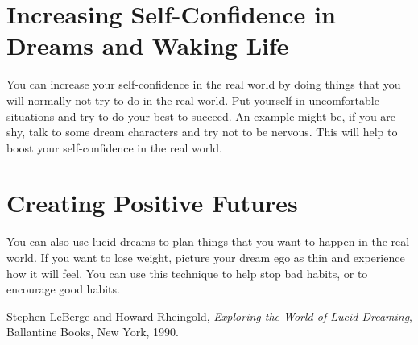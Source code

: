 \documentclass{book}
\begin{document}
\section{Increasing Self-Confidence in Dreams and Waking Life}
You can increase your self-confidence in the real world by doing things that you will normally not try to do in the real world. Put yourself in uncomfortable situations and try to do your best to succeed. An example might be, if you are shy, talk to some dream characters and try not to be nervous. This will help to boost your self-confidence in the real world.

\section{Creating Positive Futures}
You can also use lucid dreams to plan things that you want to happen in the real world. If you want to lose weight, picture your dream ego as thin and experience how it will feel. You can use this technique to help stop bad habits, or to encourage good habits. 





\begin{thebibliography}{9}

  Stephen LeBerge and Howard Rheingold,
  \textit{Exploring the World of Lucid Dreaming},
  Ballantine Books, New York,
  1990.

\end{thebibliography}
\end{document}
